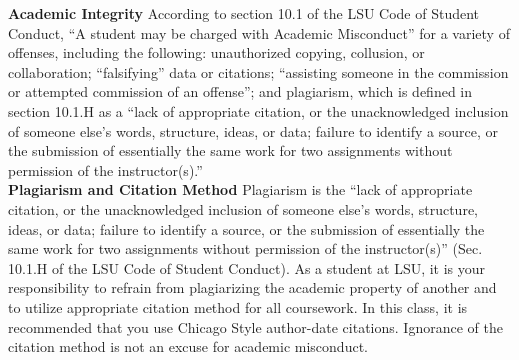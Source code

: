 \documentclass[11pt,article,oneside]{memoir}
\begin{document}
\noindent \textbf{Academic Integrity}
According to section 10.1 of the LSU Code of Student Conduct, ``A student may be charged with Academic Misconduct'' for a variety of offenses, including the following: unauthorized copying, collusion, or collaboration; ``falsifying'' data or citations; ``assisting someone in the commission or attempted commission of an offense''; and plagiarism, which is defined in section 10.1.H as a ``lack of appropriate citation, or the unacknowledged inclusion of someone else's words, structure, ideas, or data; failure to identify a source, or the submission of essentially the same work for two assignments without permission of the instructor(s).''\\

\noindent \textbf{Plagiarism and Citation Method}
Plagiarism is the ``lack of appropriate citation, or the unacknowledged inclusion of someone else's words, structure, ideas, or data; failure to identify a source, or the submission of essentially the same work for two assignments without permission of the instructor(s)'' (Sec. 10.1.H of the LSU Code of Student Conduct). As a student at LSU, it is your responsibility to refrain from plagiarizing the academic property of another and to utilize appropriate citation method for all coursework. In this class, it is recommended that you use Chicago Style author-date citations. Ignorance of the citation method is not an excuse for academic misconduct.
\end{document}

